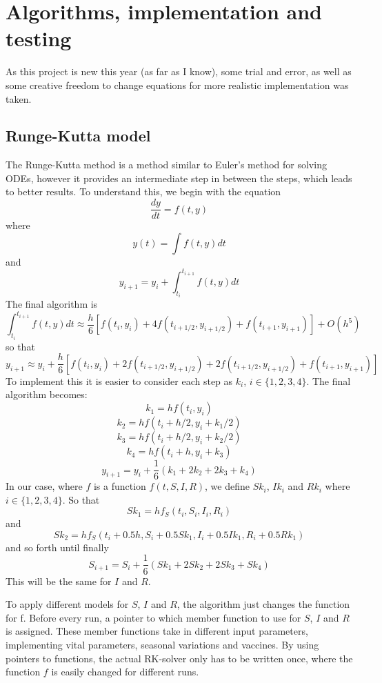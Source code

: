 \section{Algorithms, implementation and testing}
As this project is new this year (as far as I know), some trial and error, as well as some creative freedom to change equations for more realistic implementation was taken.



\subsection{Runge-Kutta model}
The Runge-Kutta method is a method similar to Euler's method for solving ODEs, however it provides an intermediate step in between the steps, which leads to better results.
To understand this, we begin with the equation
$$
\frac{d y}{d t}=f(t, y)
$$
where
$$
y(t)=\int f(t, y) d t
$$
and
$$
y_{i+1}=y_{i}+\int_{t_{i}}^{t_{i+1}} f(t, y) d t
$$
The final algorithm is
$$
\int_{t_{i}}^{t_{i+1}} f(t, y) d t \approx \frac{h}{6}\left[f\left(t_{i}, y_{i}\right)+4 f\left(t_{i+1 / 2}, y_{i+1 / 2}\right)+f\left(t_{i+1}, y_{i+1}\right)\right]+O\left(h^{5}\right)
$$
so that
$$
y_{i+1} \approx y_{i}+\frac{h}{6}\left[f\left(t_{i}, y_{i}\right)+2 f\left(t_{i+1 / 2}, y_{i+1 / 2}\right)+2 f\left(t_{i+1 / 2}, y_{i+1 / 2}\right)+f\left(t_{i+1}, y_{i+1}\right)\right]
$$
To implement this it is easier to consider each step as $k_i$, $i\in \{1,2,3,4\}$.
The final algorithm becomes:
$$
k_{1}=h f\left(t_{i}, y_{i}\right)
$$
$$
k_{2}=h f\left(t_{i}+h / 2, y_{i}+k_{1} / 2\right)
$$
$$
k_{3}=h f\left(t_{i}+h / 2, y_{i}+k_{2} / 2\right)
$$
$$
k_{4}=h f\left(t_{i}+h, y_{i}+k_{3}\right)
$$
$$
y_{i+1}=y_{i}+\frac{1}{6}\left(k_{1}+2 k_{2}+2 k_{3}+k_{4}\right)
$$
In our case, where $f$ is a function $f(t,S,I,R)$, we define $Sk_i$, $Ik_i$ and $Rk_i$ where $i\in \{1,2,3,4\}$.
So that 
$$
Sk_1 = hf_S(t_i,S_i,I_i,R_i)
$$
and
$$
Sk_{2}=hf_S(t_i+0.5h,S_i+0.5Sk_1,I_i+0.5Ik_1,R_i+0.5Rk_1)
$$
and so forth until finally
$$
S_{i+1}=S_i+\frac{1}{6}(Sk_1+2Sk_2+2Sk_3+Sk_4)
$$
This will be the same for $I$ and $R$.

To apply different models for $S$, $I$ and $R$, the algorithm just changes the function for f.
Before every run, a pointer to which member function to use for $S$, $I$ and $R$ is assigned. 
These member functions take in different input parameters, implementing vital parameters, seasonal variations and vaccines.
By using pointers to functions, the actual RK-solver only has to be written once, where the function $f$ is easily changed for different runs.

